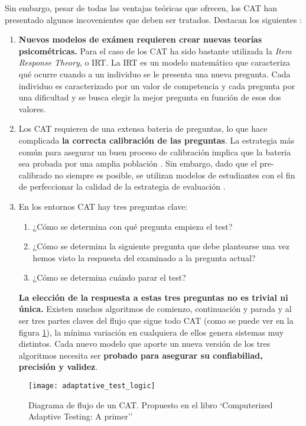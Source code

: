 Sin embargo, pesar de todas las ventajas teóricas que ofrecen, los \acrshort{CAT} han presentado algunos incovenientes que deben ser tratados. Destacan los siguientes \cite{Wainer00}:

\begin{enumerate}
 	\item \textbf{Nuevos modelos de exámen requieren crear nuevas teorías psicométricas.} Para el caso de los \acrshort{CAT} ha sido bastante utilizada la \textit{Item Response Theory}, o \acrshort{IRT}. La \acrshort{IRT} es un modelo matemático que caracteriza qué ocurre cuando a un individuo se le presenta una nueva pregunta. Cada individuo es caracterizado por un valor de competencia y cada pregunta por una dificultad y se busca elegir la mejor pregunta en función de esos dos valores\cite{Wainer83}.
	\item Los \acrshort{CAT} requieren de una extensa bateria de preguntas, lo que hace complicada \textbf{la correcta calibración de las preguntas}. La estrategia más común para asegurar un buen proceso de calibración implica que la bateria sea probada por una amplia población \cite{Klinkenberg11}. Sin embargo, dado que el pre-calibrado no siempre es posible, se utilizan modelos de estudiantes con el fin de perfeccionar la calidad de la estrategia de evaluación \cite{Antal11}\cite{Galvez09}\cite{Molins14Test}.
	\item En los entornos \acrshort{CAT} hay tres preguntas clave:
	\begin{enumerate}
		\item ¿Cómo se determina con qué pregunta empieza el test?
		\item ¿Cómo se determina la siguiente pregunta que debe plantearse una vez hemos visto la respuesta del examinado a la pregunta actual?
		\item ¿Cómo se determina cuándo parar el test?
	\end{enumerate}
	\textbf{La elección de la respuesta a estas tres preguntas no es trivial ni única.} Existen muchos algoritmos de comienzo, continuación y parada y al ser tres partes claves del flujo que sigue todo \acrshort{CAT} (como se puede ver en la figura \ref{fig:diagrama_flujo_CAT}), la mínima variación en cualquiera de ellos genera sistemas muy distintos. Cada nuevo modelo que aporte un nueva versión de los tres algoritmos necesita ser \textbf{probado para asegurar su confiabiliad, precisión y validez}\cite{Wainer00}.
\end{enumerate}

\begin{figure}[htp!]
	\centering
	\texttt{[image: adaptative\_test\_logic]}
	\caption[Diagrama de flujo de un \acrshort{CAT}]{Diagrama de flujo de un \acrshort{CAT}. Propuesto en el libro `Computerized Adaptive Testing: A primer''\cite{Wainer00}}
	\label{fig:diagrama_flujo_CAT}
\end{figure}

